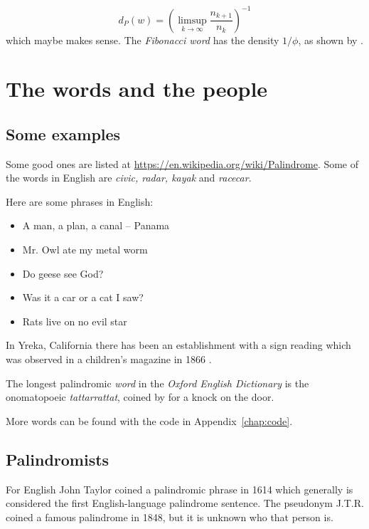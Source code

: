 \documentclass[thesis]{cluu}
\begin{document}
\begin{equation}
  d_P(w) = \left( { \limsup_{k \rightarrow \infty} \frac{n_{k+1}}{n_k} } \right)^{-1}
  \label{eq:density}
\end{equation}
which maybe makes sense.
The \emph{Fibonacci word}
  has the density \( 1/\phi \), as shown by
  \textcite[443]{adamczewski10}.

\chapter{The words and the people}

\section{Some examples}
\label{sec:examples}

Some good ones are listed at
\url{https://en.wikipedia.org/wiki/Palindrome}. Some of the words in
English are \emph{civic, radar, kayak} and \emph{racecar}.

Here are some phrases in English:
\begin{itemize}
\item A man, a plan, a canal -- Panama
\item Mr. Owl ate my metal worm
\item Do geese see God?
\item Was it a car or a cat I saw?
\item Rats live on no evil star
\end{itemize}

In Yreka, California there has been an establishment with a sign
reading  which was observed in a children's magazine
in 1866 \parencite[30]{eckler01}.

The longest palindromic \emph{word} in the \emph{Oxford English Dictionary}
is the onomatopoeic \emph{tattarrattat}, coined by
\textcite{joyce22} for a knock on the door.

More words can be found with the code in Appendix~\ref{chap:code}.

\section{Palindromists}

For English John Taylor coined a palindromic phrase in 1614 which
generally is considered the first English-language palindrome
sentence. The pseudonym J.T.R. coined a famous palindrome in 1848,
but it is unknown who that person is.
\end{document}
